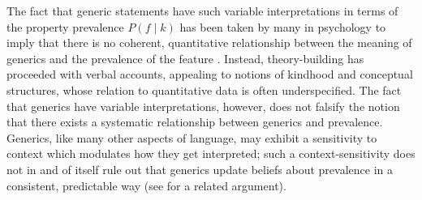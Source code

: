 \documentclass[floatsintext,doc]{apa6}
\begin{document}
The fact that generic statements have such variable interpretations in terms of the property prevalence $P(f \mid k)$ has been taken by many in psychology to imply that there is no coherent, quantitative relationship between the meaning of generics and the prevalence of the feature \cite{Leslie2008, Cimpian2010, Khemlani2012, Prasada2013}. 
Instead, theory-building has proceeded with verbal accounts, appealing to notions of kindhood and conceptual structures, whose relation to quantitative data is often underspecified.
The fact that generics have variable interpretations, however, does not falsify the notion that there exists a systematic relationship between generics and prevalence.
Generics, like many other aspects of language, may exhibit a sensitivity to context  which  modulates how they get interpreted; such a context-sensitivity does not in and of itself rule out that generics update beliefs about prevalence in a consistent, predictable way (see  for a related argument). 

\end{document}
